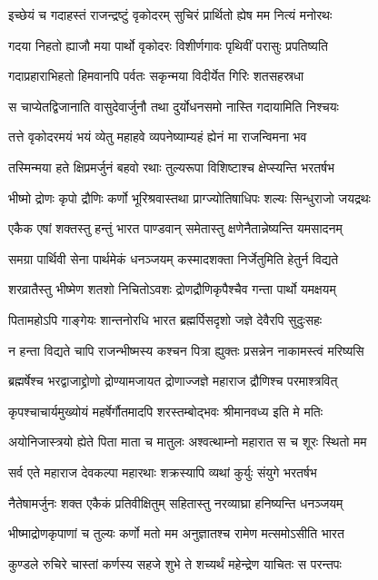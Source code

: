 \twolineshloka
{इच्छेयं च गदाहस्तं राजन्द्रष्टुं वृकोदरम्}
{सुचिरं प्रार्थितो ह्येष मम नित्यं मनोरथः}


\twolineshloka
{गदया निहतो ह्याजौ मया पार्थो वृकोदरः}
{विशीर्णगावः पृथिवीं परासुः प्रपतिष्यति}


\twolineshloka
{गदाप्रहाराभिहतो हिमवानपि पर्वतः}
{सकृन्मया विदीर्येत गिरिः शतसहस्रधा}


\twolineshloka
{स चाप्येतद्विजानाति वासुदेवार्जुनौ तथा}
{दुर्योधनसमो नास्ति गदायामिति निश्चयः}


\twolineshloka
{तत्ते वृकोदरमयं भयं व्येतु महाहवे}
{व्यपनेष्याम्यहं ह्येनं मा राजन्विमना भव}


\twolineshloka
{तस्मिन्मया हते क्षिप्रमर्जुनं बहवो रथाः}
{तुल्यरूपा विशिष्टाश्च क्षेप्स्यन्ति भरतर्षभ}


\twolineshloka
{भीष्मो द्रोणः कृपो द्रौणिः कर्णो भूरिश्रवास्तथा}
{प्राग्ज्योतिषाधिपः शल्यः सिन्धुराजो जयद्रथः}


\twolineshloka
{एकैक एषां शक्तस्तु हन्तुं भारत पाण्डवान्}
{समेतास्तु क्षणेनैतान्नेष्यन्ति यमसादनम्}


\twolineshloka
{समग्रा पार्थिवी सेना पार्थमेकं धनञ्जयम्}
{कस्मादशक्ता निर्जेतुमिति हेतुर्न विद्यते}


\twolineshloka
{शरव्रातैस्तु भीष्मेण शतशो निचितोऽवशः}
{द्रोणद्रौणिकृपैश्चैव गन्ता पार्थो यमक्षयम्}


\twolineshloka
{पितामहोऽपि गाङ्गेयः शान्तनोरधि भारत}
{ब्रह्मर्पिसदृशो जज्ञे देवैरपि सुदुःसहः}


\twolineshloka
{न हन्ता विद्यते चापि राजन्भीष्मस्य कश्चन}
{पित्रा ह्युक्तः प्रसन्नेन नाकामस्त्वं मरिष्यसि}


\twolineshloka
{ब्रह्मर्षेश्च भरद्वाजाद्द्रोणो द्रोण्यामजायत}
{द्रोणाज्जज्ञे महाराज द्रौणिश्च परमाश्त्रवित्}


\twolineshloka
{कृपश्चाचार्यमुख्योयं महर्षेर्गौतमादपि}
{शरस्तम्बोद्भवः श्रीमानवध्य इति मे मतिः}


\twolineshloka
{अयोनिजास्त्रयो ह्येते पिता माता च मातुलः}
{अश्वत्थाम्नो महारात स च शूरः स्थितो मम}


\twolineshloka
{सर्व एते महाराज देवकल्पा महारथाः}
{शक्रस्यापि व्यथां कुर्युः संयुगे भरतर्षभ}


\twolineshloka
{नैतेषामर्जुनः शक्त एकैकं प्रतिवीक्षितुम्}
{सहितास्तु नरव्याघ्रा हनिष्यन्ति धनञ्जयम्}


\twolineshloka
{भीष्माद्रोणकृपाणां च तुल्यः कर्णो मतो मम}
{अनुज्ञातश्च रामेण मत्समोऽसीति भारत}


\twolineshloka
{कुण्डले रुचिरे चास्तां कर्णस्य सहजे शुभे}
{ते शच्यर्थं महेन्द्रेण याचितः स परन्तपः}


